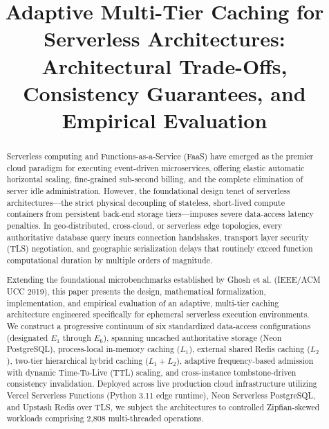 \documentclass[conference]{IEEEtran}
\begin{document}
\title{Adaptive Multi-Tier Caching for Serverless Architectures: Architectural Trade-Offs, Consistency Guarantees, and Empirical Evaluation}

\author{
}

\maketitle

\begin{abstract}
Serverless computing and Functions-as-a-Service (FaaS) have emerged as the premier cloud paradigm for executing event-driven microservices, offering elastic automatic horizontal scaling, fine-grained sub-second billing, and the complete elimination of server idle administration. However, the foundational design tenet of serverless architectures---the strict physical decoupling of stateless, short-lived compute containers from persistent back-end storage tiers---imposes severe data-access latency penalties. In geo-distributed, cross-cloud, or serverless edge topologies, every authoritative database query incurs connection handshakes, transport layer security (TLS) negotiation, and geographic serialization delays that routinely exceed function computational duration by multiple orders of magnitude.

Extending the foundational microbenchmarks established by Ghosh et al. (IEEE/ACM UCC 2019), this paper presents the design, mathematical formalization, implementation, and empirical evaluation of an adaptive, multi-tier caching architecture engineered specifically for ephemeral serverless execution environments. We construct a progressive continuum of six standardized data-access configurations (designated $E_1$ through $E_6$), spanning uncached authoritative storage (Neon PostgreSQL), process-local in-memory caching ($L_1$), external shared Redis caching ($L_2$), two-tier hierarchical hybrid caching ($L_1 + L_2$), adaptive frequency-based admission with dynamic Time-To-Live (TTL) scaling, and cross-instance tombstone-driven consistency invalidation. Deployed across live production cloud infrastructure utilizing Vercel Serverless Functions (Python 3.11 edge runtime), Neon Serverless PostgreSQL, and Upstash Redis over TLS, we subject the architectures to controlled Zipfian-skewed workloads comprising 2,808 multi-threaded operations.


\end{abstract}
\end{document}
